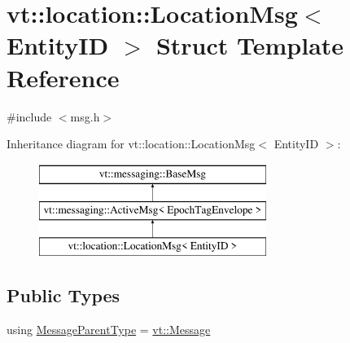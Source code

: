 \hypertarget{structvt_1_1location_1_1_location_msg}{}\section{vt\+:\+:location\+:\+:Location\+Msg$<$ Entity\+ID $>$ Struct Template Reference}
\label{structvt_1_1location_1_1_location_msg}


{\ttfamily \#include $<$msg.\+h$>$}

Inheritance diagram for vt\+:\+:location\+:\+:Location\+Msg$<$ Entity\+ID $>$\+:\begin{figure}[H]
\begin{center}
\leavevmode
\includegraphics[height=3.000000cm]{structvt_1_1location_1_1_location_msg}
\end{center}
\end{figure}
\subsection*{Public Types}
\begin{DoxyCompactItemize}
\item 
using \hyperlink{structvt_1_1location_1_1_location_msg_a025bf9f7e29a87fbe01735e2a5db0857}{Message\+Parent\+Type} = \hyperlink{namespacevt_a3a3ddfef40b4c90915fa43cdd5f129ea}{vt\+::\+Message}
\end{DoxyCompactItemize}
